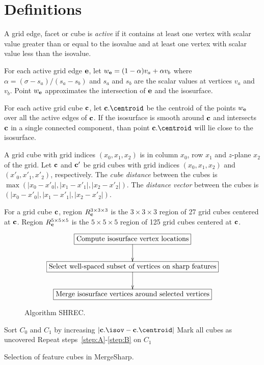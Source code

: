 
\section{Definitions}

A grid edge, facet or cube is {\em active} if it contains at least one vertex 
with scalar value greater than or equal to the isovalue
and at least one vertex with scalar value less than the isovalue.

For each active grid edge $\mathbf{e}$,
let $w_{\mathbf{e}} = (1-\alpha) v_a + \alpha v_b$
where $\alpha = (\sigma - s_a)/(s_a-s_b)$
and $s_a$ and $s_b$ are the scalar values at vertices $v_a$ and $v_b$.
Point $w_{\mathbf{e}}$ approximates the intersection of $\mathbf{e}$ and the isosurface.

For each active grid cube $\mathbf{c}$,
let $\cb.\centroid$ be the centroid of the points $w_{\mathbf{e}}$
over all the active edges of $\mathbf{c}$.
If the isosurface is smooth around $\mathbf{c}$
and intersects $\mathbf{c}$ in a single connected component,
than point $\cb.\centroid$ will lie close to the isosurface.

A grid cube with grid indices $(x_0,x_1,x_2)$ is in column $x_0$, row $x_1$
and $z$-plane $x_2$ of the grid.
Let $\mathbf{c}$ and $\mathbf{c}'$ be grid cubes with grid indices $(x_0,x_1,x_2)$
and $(x'_0,x'_1,x'_2)$, respectively.
The {\em cube distance} between the cubes 
is $\max(|x_0-x'_0|, |x_1-x'_1|, |x_2-x'_2|)$.
The {\em distance vector} between the cubes is
$(|x_0-x'_0|, |x_1-x'_1|, |x_2-x'_2|)$.

For a grid cube $\mathbf{c}$, region $R^{3 \times 3 \times 3}_{\mathbf{c}}$ is the $3 \times 3 \times 3$ region
of 27 grid cubes centered at $\mathbf{c}$.
Region $R^{5 \times 5 \times 5}_{\mathbf{c}}$ is the $5 \times 5 \times 5$ region
of 125 grid cubes centered at $\mathbf{c}$.


\begin{figure}
\begin{equation*}
\xymatrix{
\action{Compute isosurface vertex locations} \ar[d] \\
\action{Select well-spaced subset of vertices on sharp features} \ar[d] \\
\action{Merge isosurface vertices around selected vertices}
}
\end{equation*}
\caption{Algorithm SHREC.}
\label{alg:shrec}
\end{figure}


\begin{algorithm}[t]
Sort $C_0$ and $C_1$ by increasing $|\cb.\isov-\cb.\centroid|$\;
Mark all cubes as uncovered\;
\label{step:B}
Repeat steps~\ref{step:A}-\ref{step:B} on $C_1$\;
\caption{Selection of feature cubes in MergeSharp.}
\label{alg:mergesharp_select}
\end{algorithm}


